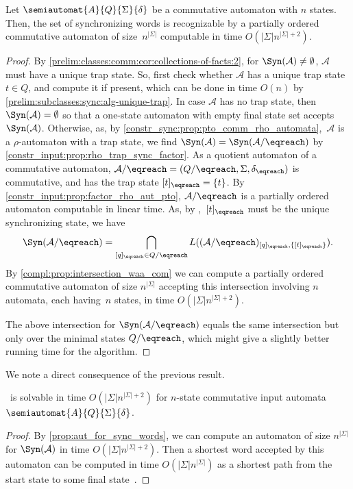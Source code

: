 \begin{proposition}
	\label{prop:aut_for_sync_words}
	Let $\semiautomat{A}{Q}{\Sigma}{\delta}$
	be a commutative automaton with $n$ states.
	Then, the set of synchronizing words
	is recognizable by a partially ordered commutative automaton
	of size~$n^{|\Sigma|}$
 	computable in time $O(|\Sigma|n^{|\Sigma|+2})$.
\end{proposition}
\begin{proof}		
	By \cref{prelim:classes:comm:cor:collections-of-facts:2}, 
	for $\Syn(\mathcal A) \ne \emptyset$,
	$\mathcal A$ must have a unique trap state.
	So, first check whether $\mathcal A$
	has a unique trap state $t \in Q$, and compute it if present, 
	which can be done in time $O(n)$ by \cref{prelim:subclasses:sync:alg-unique-trap}.
	In case $\mathcal A$
	has no trap state, then $\Syn(\mathcal A) = \emptyset$
	so that a one-state automaton with empty final state set
	accepts $\Syn(\mathcal A)$.
	Otherwise,  as, by \cref{constr_sync:prop:pto_comm_rho_automata},~$\mathcal A$ is a $\rho$-automaton
	with a trap state,
	we find $\Syn(\mathcal A) = \Syn(\mathcal A / {\eqreach})$  by \cref{constr_input:prop:rho_trap_sync_factor}.
	As a quotient automaton of a commutative automaton,
	$\mathcal A / {\eqreach} = (Q / {\eqreach}, \Sigma, \delta_{\eqreach})$
	is commutative, and has the trap state $[t]_{\eqreach} = \{t\}$.
	By \cref{constr_input:prop:factor_rho_aut_pto}, 
	$\mathcal A / {\eqreach}$
	is a partially ordered automaton
	computable in linear time.	
	As, by ,~$[t]_{\eqreach}$ must be the unique synchronizing state, we have
	\[
	\Syn(\mathcal A / {\eqreach}) = \bigcap_{[q]_{\eqreach} \in Q / {\eqreach}} L(( \mathcal A / {\eqreach} )_{[q]_{\eqreach}, \{[t]_{\eqreach}\}}).
	\]
	By \cref{compl:prop:intersection_waa_com} 
	we can compute a partially ordered commutative
	automaton of size $n^{|\Sigma|}$ accepting this intersection involving $n$ automata,
	each having~$n$ states,	in time $O(|\Sigma|n^{|\Sigma|+2})$.
	
	The above intersection for $\Syn(\mathcal A / {\eqreach})$
	equals the same intersection but only over
	the minimal states $Q / {\eqreach}$, which might give a slightly better running time for the algorithm.
\end{proof}

We note a direct consequence of the previous result.

\begin{corollary}	\label{cor:aut_for_sync_words}
	\DFASWS\ is solvable in time $O(|\Sigma|n^{|\Sigma|+2})$
	for $n$-state commutative input automata $\semiautomat{A}{Q}{\Sigma}{\delta}$.	
\end{corollary}
\begin{proof} 
	By \cref{prop:aut_for_sync_words}, 
	we can compute an automaton of size $n^{|\Sigma|}$
	for $\Syn(\mathcal A)$ in time $O(|\Sigma|n^{|\Sigma|+2})$. Then a shortest word accepted
	by this automaton can be computed in time $O(|\Sigma|n^{|\Sigma|})$
	as a shortest path from the start state to some final state~\cite{cormen01introduction}.
\end{proof}

